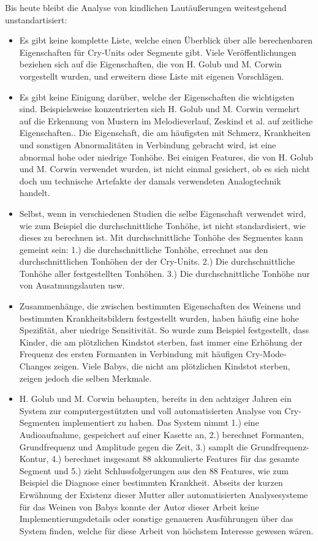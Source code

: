 Bis heute bleibt die Analyse von kindlichen Lautäußerungen weitestgehend unstandartisiert: \cite[S. 142]{signal}
\begin{itemize}
	\item Es gibt keine komplette Liste, welche einen Überblick über alle berechenbaren Eigenschaften für Cry-Units oder Segmente gibt. Viele Veröffentlichungen beziehen sich auf die Eigenschaften, die von H. Golub und M. Corwin vorgestellt wurden, und erweitern diese Liste mit eigenen Vorschlägen. 
	\item Es gibt keine Einigung darüber, welche der Eigenschaften die wichtigsten sind. Beispielsweise konzentrierten sich H. Golub und M. Corwin \cite{cryModel} vermehrt auf die Erkennung von Mustern im Melodieverlauf, Zeskind et al. auf zeitliche Eigenschaften.\cite{rythmic}. Die Eigenschaft, die am häufigsten mit Schmerz, Krankheiten und sonstigen Abnormalitäten in Verbindung gebracht wird, ist eine abnormal hohe oder niedrige Tonhöhe. Bei einigen Features, die von H. Golub und M. Corwin verwendet wurden, ist nicht einmal gesichert, ob es sich nicht doch um technische Artefakte der damals verwendeten Analogtechnik handelt. \cite[S. 84 - 85]{parentalPerception}
	\item Selbst, wenn in verschiedenen Studien die selbe Eigenschaft verwendet wird, wie zum Beispiel die durchschnittliche Tonhöhe, ist nicht standardisiert, wie dieses zu berechnen ist. Mit \glqq durchschnittliche Tonhöhe des Segmentes\grqq{} kann gemeint sein: 1.) die durchschnittliche Tonhöhe, errechnet aus den durchschnittlichen Tonhöhen der der Cry-Units. 2.) Die durchschnittliche Tonhöhe aller festgestellten Tonhöhen. 3.) Die durchschnittliche Tonhöhe nur von Ausatmungslauten usw.
	\item Zusammenhänge, die zwischen bestimmten Eigenschaften des Weinens und bestimmten Krankheitsbildern festgestellt wurden, haben häufig eine hohe Spezifität, aber niedrige Sensitivität. So wurde zum Beispiel festgestellt, dass Kinder, die am plötzlichen Kindstot sterben, fast immer eine Erhöhung der Frequenz des ersten Formanten in Verbindung mit häufigen Cry-Mode-Changes zeigen. Viele Babys, die nicht am plötzlichen Kindstot sterben, zeigen jedoch die selben Merkmale.\cite[S. 85]{parentalPerception}
	\item H. Golub und M. Corwin behaupten, bereits in den achtziger Jahren ein System zur computergestützten und voll automatisierten Analyse von Cry-Segmenten implementiert zu haben. Das System nimmt 1.) eine Audioaufnahme, gespeichert auf einer Kasette an, 2.) berechnet Formanten, Grundfrequenz und Amplitude gegen die Zeit, 3.) samplt die Grundfrequenz-Kontur, 4.) berechnet insgesamt 88 akkumulierte Features für das gesamte Segment und 5.) zieht Schlussfolgerungen aus den 88 Features, wie zum Beispiel die Diagnose einer bestimmten Krankheit.\cite[S. 75 - 76]{cryModel} Abseits der kurzen Erwähnung der Existenz dieser \glqq Mutter aller automatisierten Analysesysteme für das Weinen von Babys\grqq{} konnte der Autor dieser Arbeit keine Implementierungsdetails oder sonstige genaueren Ausführungen über das System finden, welche für diese Arbeit von höchstem Interesse gewesen wären.
\end{itemize}


